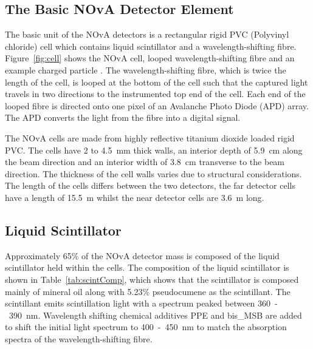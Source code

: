 \subsection{The Basic NOvA Detector Element} \label{sec:cell}

The basic unit of the NOvA detectors is a rectangular rigid PVC
(Polyvinyl chloride) cell
which contains liquid scintillator and a wavelength-shifting
fibre. %
Figure~\ref{fig:cell} shows the NOvA cell, looped wavelength-shifting
fibre and an example charged particle .
The wavelength-shifting fibre, which is twice
the length of the 
cell, is looped at the bottom of the cell such that the captured light
travels in two directions to the instrumented top end of the cell. 
Each end of the looped fibre is directed onto one pixel of an
Avalanche Photo Diode (APD) array.
The APD converts the light from the fibre into a digital signal.


The NOvA cells are made from highly reflective titanium dioxide loaded
rigid PVC. The cells have 2 to 4.5~mm thick walls, an interior depth
of 5.9~cm along the beam direction and an interior width of 3.8~cm
transverse to the beam direction. The thickness of the cell walls
varies due to structural considerations.
The length of the cells differs
between the two detectors, the far detector cells have a length of
15.5~m whilst the near detector cells are 3.6~m long.


\subsection{Liquid Scintillator}

Approximately 65\% of the NOvA detector mass is composed of the liquid
scintillator held within the cells. The composition of the liquid
scintillator is shown in Table~\ref{tab:scintComp}, which shows that
the scintillator is composed mainly of mineral oil along with 5.23\%
pseudocumene as the scintillant. The scintillant emits scintillation
light with a spectrum peaked between 360~-~390~nm. Wavelength shifting
chemical additives PPE and bis\_MSB are added to shift the initial
light spectrum to 400~-~450~nm to match the absorption spectra of the
wavelength-shifting fibre. 


